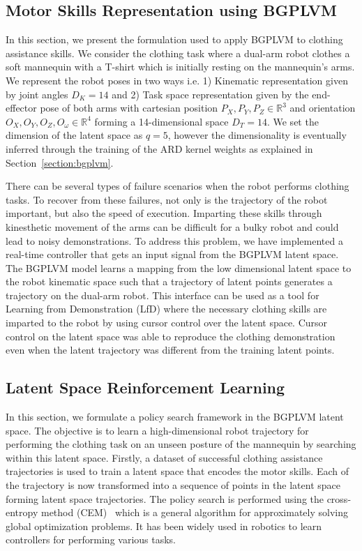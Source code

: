 \documentclass{article}
\begin{document}
\subsection{Motor Skills Representation using BGPLVM}
\label{section:clothassist}

In this section, we present the formulation used to apply BGPLVM to clothing assistance skills. We consider the clothing task where a dual-arm robot clothes a soft mannequin with a T-shirt which is initially resting on the mannequin's arms. We represent the robot poses in two ways i.e. 1) Kinematic representation given by joint angles $D_K = 14$ and 2) Task space representation given by the end-effector pose of both arms with cartesian position ${P_X,P_Y,P_Z} \in \mathbb{R}^3$ and orientation ${O_X,O_Y,O_Z,O_{\omega}} \in \mathbb{R}^4$ forming a 14-dimensional space $D_T = 14$. We set the dimension of the latent space as $q = 5$, however the dimensionality is eventually inferred through the training of the ARD kernel weights as explained in Section~\ref{section:bgplvm}.

There can be several types of failure scenarios when the robot performs clothing tasks. To recover from these failures, not only is the trajectory of the robot important, but also the speed of execution. Imparting these skills through kinesthetic movement of the arms can be difficult for a bulky robot and could lead to noisy demonstrations. To address this problem, we have implemented a real-time controller that gets an input signal from the BGPLVM latent space. The BGPLVM model learns a mapping from the low dimensional latent space to the robot kinematic space such that a trajectory of latent points generates a trajectory on the dual-arm robot. This interface can be used as a tool for Learning from Demonstration (LfD) where the necessary clothing skills are imparted to the robot by using cursor control over the latent space. Cursor control on the latent space was able to reproduce the clothing demonstration even when the latent trajectory was different from the training latent points.

\subsection{Latent Space Reinforcement Learning}
\label{section:latentrl}

In this section, we formulate a policy search framework in the BGPLVM latent space. The objective is to learn a high-dimensional robot trajectory for performing the clothing task on an unseen posture of the mannequin by searching within this latent space. Firstly, a dataset of successful clothing assistance trajectories is used to train a latent space that encodes the motor skills. Each of the trajectory is now transformed into a sequence of points in the latent space forming latent space trajectories. The policy search is performed using the cross-entropy method (CEM)~\cite{cem} which is a general algorithm for approximately solving global optimization problems. It has been widely used in robotics to learn controllers for performing various tasks.
\end{document}
